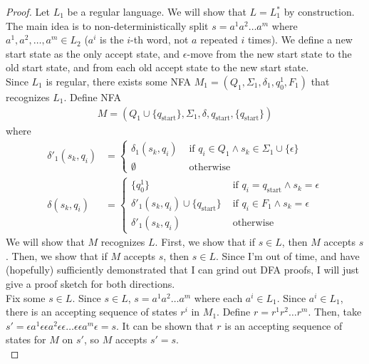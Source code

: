 \documentclass{article}
\begin{document}
\begin{proof}
    Let $L_1$ be a regular language. We will show that $L = L_1^*$ by construction. The main idea is to non-deterministically split $s = a^1 a^2 \ldots a^m$ 
    where $a^1, a^2, \ldots, a^m \in L_2$ ($a^{i}$ is the $i$-th word, not $a$ repeated $i$ times). We define a new start state as the only accept state, and
    $\epsilon$-move from the new start state to the old start state, and from each old accept state to the new start state. \\

    \noindent
    Since $L_1$ is regular, there exists some NFA $M_1 = (Q_1, \Sigma_1, \delta_1, q_0^1, F_1)$ that recognizes $L_1$. Define NFA
    \begin{align*}
        M = (Q_1 \cup \{ q_{\text{start}} \}, \Sigma_1, \delta, q_{\text{start}}, \{ q_{\text{start}} \})
    \end{align*}
    where
    \begin{align*}
        \delta'_1(s_k, q_i) &= \begin{cases}
            \delta_1(s_k, q_i) & \text{ if } q_i \in Q_1 \land s_k \in \Sigma_1 \cup \{ \epsilon \} \\
            \emptyset & \text{ otherwise}
        \end{cases} \\
        \delta(s_k, q_i) &= \begin{cases}
            \{ q_0^1 \} & \text{ if } q_i = q_{\text{start}} \land s_k = \epsilon \\
            \delta'_1(s_k, q_i) \cup \{ q_{\text{start}} \} & \text{ if } q_i \in F_1 \land s_k = \epsilon \\
            \delta'_1(s_k, q_i) & \text{ otherwise}
        \end{cases}
    \end{align*}
    We will show that $M$ recognizes $L$. First, we show that if $s \in L$, then $M$ accepts $s$. Then, we show that if $M$ accepts $s$, then $s \in L$. Since 
    I'm out of time, and have (hopefully) sufficiently demonstrated that I can grind out DFA proofs, I will just give a proof sketch for both directions. \\

    \noindent
    Fix some $s \in L$. Since $s \in L$, $s = a^1 a^2 \ldots a^m$ where each $a^i \in L_1$. Since $a^i \in L_1$, there is an accepting sequence of states $r^i$ 
    in $M_1$. Define $r = r^1 r^2 \ldots r^m$. Then, take $s' = \epsilon a^1 \epsilon \epsilon a^2 \epsilon \epsilon \ldots \epsilon \epsilon a^m \epsilon = s$. It can be shown that $r$ is an accepting
    sequence of states for $M$ on $s'$, so $M$ accepts $s' = s$. \\


\end{proof}
\end{document}

